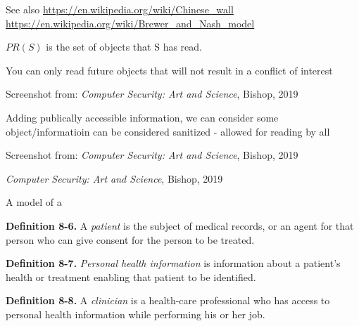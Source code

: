 \documentclass[Screen16to9,17pt]{foils}
\begin{document}
See also
\url{https://en.wikipedia.org/wiki/Chinese_wall}\\
\url{https://en.wikipedia.org/wiki/Brewer_and_Nash_model}


$P R(S)$ is the set of objects that S has read.


You can only read future objects that will not result in a conflict of interest

Screenshot from:
\emph{Computer Security: Art and Science}, Bishop, 2019



Adding publically accessible information, we can consider some object/informatioin can be considered sanitized - allowed for reading by all

Screenshot from:
\emph{Computer Security: Art and Science}, Bishop, 2019




\emph{Computer Security: Art and Science}, Bishop, 2019





\begin{list1}
\item A model of a
\item {\bf Definition 8-6.} A \emph{patient} is the subject of medical records, or an agent for that person who can give consent for the person to be treated.
\item {\bf Definition 8-7.} \emph{Personal health information} is information about a patient's health or treatment enabling that patient to be identified.
\item {\bf Definition 8-8.} A \emph{clinician} is a health-care professional who has access to personal health information while performing his or her job.
\end{list1}
\end{document}
